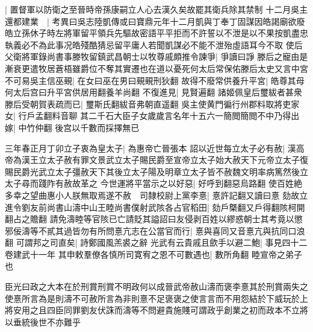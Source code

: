 |{
	置督軍以防衛之至晉時帝孫康嗣立人心去漢久矣故罷其衛兵除其禁制}
十二月吳主還都建業　|{
	考異曰吳志陸凱傳或曰寶鼎元年十二月凱與丁奉丁固謀因皓謁廟欲廢皓立孫休子時左將軍留平領兵先驅故密語平平拒而不許誓以不泄是以不果按凱盡忠執義必不為此事况皓殘酷猜忌留平庸人若聞凱謀必不能不泄殆虛語耳今不取}
使后父衛將軍錄尚書事滕牧留鎮武昌朝士以牧尊戚頗推令諫爭|{
	爭讀曰諍}
滕后之寵由是漸衰更遣牧居蒼梧雖爵位不奪其實遷也在道以憂死何太后常保佑滕后太史又言中宮不可易吳主信巫覡|{
	在女曰巫在男曰覡覡刑狄翻}
故得不廢常供養升平宮|{
	皓尊其母何太后宫曰升平宮供居用翻養羊尚翻}
不復進見|{
	見賢遍翻}
諸姬佩皇后璽紱者甚衆滕后受朝賀表疏而已|{
	璽斯氏翻紱音弗朝直遥翻}
吳主使黄門徧行州郡料取將吏家女|{
	行戶孟翻料音聊}
其二千石大臣子女歲歲言名年十五六一簡閲簡閲不中乃得出嫁|{
	中竹仲翻}
後宫以千數而採擇無已

三年春正月丁卯立子衷為皇太子|{
	為惠帝亡晉張本}
詔以近世每立太子必有赦|{
	漢高帝為漢王立太子赦有罪文景武立太子賜民爵至宣帝立太子始大赦天下元帝立太子復賜民爵光武立太子彊赦天下其後立太子陽及明章立太子皆不赦魏文明率病篤然後立太子尋而踐阼有赦故革之}
今世運將平當示之以好惡|{
	好呼到翻惡烏路翻}
使百姓絶多幸之望曲惠小人朕無取焉遂不赦　司隸校尉上黨李憙|{
	憙許記翻又讀曰憙}
劾故立進令劉友前尚書山濤中山王睦尚書僕射武陔各占官稻田|{
	劾戶槩翻又戶得翻陔柯開翻占之贍翻}
請免濤睦等官陔已亡請貶其謚詔曰友侵剥百姓以繆惑朝士其考竟以懲邪佞濤等不貳其過皆勿有所問憙亢志在公當官而行|{
	憙與喜同又音憙亢與抗同口浪翻}
可謂邦之司直矣|{
	詩鄭國風羔裘之辭}
光武有云貴戚且歛手以避二鮑|{
	事見四十二卷建武十一年}
其申敕羣僚各慎所司寛宥之恩不可數遇也|{
	數所角翻}
睦宣帝之弟子也

臣光曰政之大本在於刑賞刑賞不明政何以成晉武帝赦山濤而褒李憙其於刑賞兩失之使憙所言為是則濤不可赦所言為非則憙不足褒褒之使言言而不用怨結於下威玩於上將安用之且四臣同罪劉友伏誅而濤等不問避貴施賤可謂政乎創業之初而政本不立將以垂統後世不亦難乎

